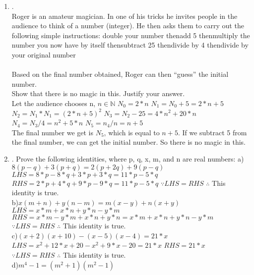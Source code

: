 \documentclass{article}
\theoremstyle{definition}
\theoremstyle{plain}
\begin{document}
\begin {enumerate}[itemindent=30pt,label=\bf Exercise {\arabic*}:]
\subitem \;\;\;\;We can conclude that if I add the squares of three consecutive integer numbers and then subtract two, I always get a multiple of 3.
\\
\item .
\\ Roger is an amateur magician. In one of his tricks he invites people in the audience to think of a number (integer). He then asks them to carry out the following simple instructions:
\subitem \;\;\;\;\;\;\;\;\;\;\;double your number
\subitem then\;\;\;\;add 5
\subitem then\;\;\;\;multiply the number you now have by itself
\subitem then\;\;\;\;subtract 25
\subitem then\;\;\;\;divide by 4
\subitem then\;\;\;\;divide by your original number
\\
\\Based on the final number obtained, Roger can then “guess” the initial number.
\\
Show that there is no magic in this. Justify your answer.
\\
\subitem Let the audience chooses n, $n \in \mathbb{N}$
\subitem $N_0 = 2*n$
\subitem $N_1 = N_0 + 5 = 2*n + 5$ 
\subitem $N_2 = N_1*N_1 = (2*n+5)^2$
\subitem $N_3 = N_2 - 25 = 4*n^2 + 20*n $
\subitem $N_4 = N_3/4 = n^2 + 5*n$
\subitem $N_5 = n_4/n = n + 5$
\\
\subitem The final number we get is $N_5$, which is equal to $n+5$. If we subtract 5 from the final number, we can get the initial number. So there is no magic in this.
\item .
Prove the following identities, where p, q, x, m, and n are real numbers:
\subitem a)$8(p-q)+3(p+q)=2(p+2q)+9(p-q)$
\\
\subitem \;\;\;\;$LHS = 8*p-8*q+3*p+3*q = 11*p-5*q$
\subitem \;\;\;\;$RHS = 2*p+4*q+9*p-9*q = 11*p-5*q$
\subitem \;\;\;\;$\because LHS = RHS$
\subitem \;\;\;\;$\therefore$ This identity is true.
\\
\subitem b)$x(m+n)+y(n-m)=m(x-y)+n(x+y)$
\\
\subitem \;\;\;\;$LHS = x*m+x*n+y*n-y*m$
\subitem \;\;\;\;$RHS = x*m-y*m+x*n+y*n = x*m+x*n+y*n-y*m$
\subitem \;\;\;\;$\because LHS = RHS$
\subitem \;\;\;\;$\therefore$ This identity is true.
\\
\subitem c)$(x+2)(x+10)-(x-5)(x-4)=21*x$
\\
\subitem \;\;\;\;$LHS = x^2 + 12 * x + 20 - x^2 + 9*x -20 = 21*x$
\subitem \;\;\;\;$RHS = 21*x$
\subitem \;\;\;\;$\because LHS = RHS$
\subitem \;\;\;\;$\therefore$ This identity is true.
\\
\subitem d)$m^4-1=(m^2+1)(m^2-1)$

\end{enumerate}
\end{document}

